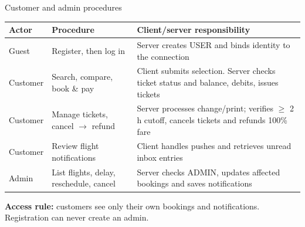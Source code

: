 \documentclass[t,aspectratio=169]{beamer}
\newcommand{\gap}{\par\vspace{0.18cm}}
\begin{document}
\begin{frame}{Customer and admin procedures}
\small
\begin{tabularx}{\textwidth}{@{}lYY@{}}
\toprule
\textbf{Actor} & \textbf{Procedure} & \textbf{Client/server responsibility}\\
\midrule
Guest & Register, then log in & Server creates USER and binds identity to the connection\\
Customer & Search, compare, book \& pay & Client submits selection. Server checks ticket status and balance, debits, issues tickets\\
Customer & Manage tickets, cancel $\rightarrow$ refund & Server processes change/print; verifies $\ge$ 2 h cutoff, cancels tickets and refunds 100\% fare\\
Customer & Review flight notifications & Client handles pushes and retrieves unread inbox entries\\
Admin & List flights, delay, reschedule, cancel & Server checks ADMIN, updates affected bookings and saves notifications\\
\bottomrule
\end{tabularx}
\gap
\textbf{Access rule:} customers see only their own bookings and notifications. Registration can never create an admin.
\end{frame}
\end{document}
